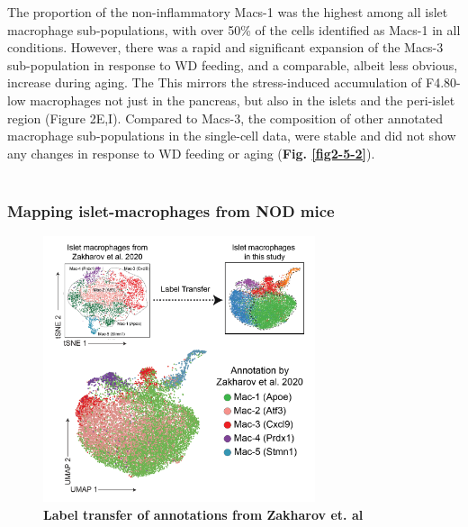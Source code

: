 The proportion of the non-inflammatory Macs-1 was the highest among all islet macrophage sub-populations, with over 50\% of the cells identified as Macs-1 in all conditions. However, there was a rapid and significant expansion of the Macs-3 sub-population in response to WD feeding, and a comparable, albeit less obvious, increase during aging. The This mirrors the stress-induced accumulation of F4.80-low macrophages not just in the pancreas, but also in the islets and the peri-islet region (Figure 2E,I). Compared to Macs-3, the composition of other annotated macrophage sub-populations in the single-cell data, were stable and did not show any changes in response to WD feeding or aging (\textbf{Fig. \ref{fig2-5-2}}).\\\\



\subsubsection{Mapping islet-macrophages from NOD mice}

\begin{figure}
\includegraphics[width=8cm]{Chapter4/Fig/F2-5-02.png}
\caption[res-macs3]{\textbf{Label transfer of annotations from Zakharov et. al}}
\label{fig2-5-3}
\end{figure}

